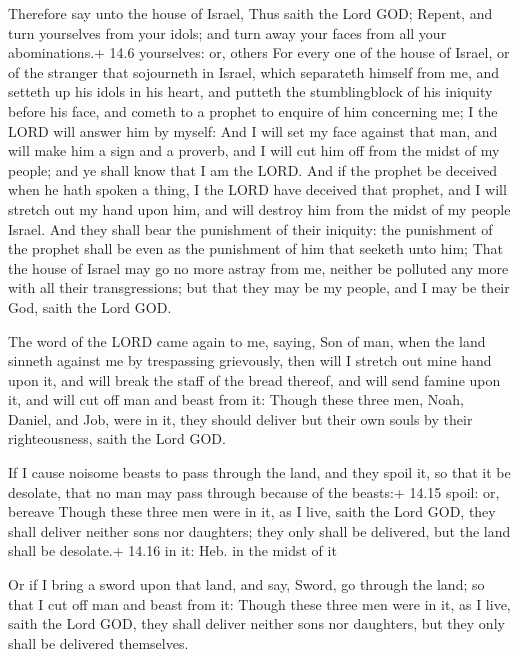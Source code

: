  Therefore say unto the house of Israel, Thus saith the
Lord GOD; Repent, and turn yourselves from your idols; and turn away
your faces from all your abominations.+ 14.6 yourselves: or, others
 For every one of the house of Israel, or of the stranger
that sojourneth in Israel, which separateth himself from me, and setteth
up his idols in his heart, and putteth the stumblingblock of his
iniquity before his face, and cometh to a prophet to enquire of him
concerning me; I the LORD will answer him by myself:  And I
will set my face against that man, and will make him a sign and a
proverb, and I will cut him off from the midst of my people; and ye
shall know that I am the LORD.  And if the prophet be
deceived when he hath spoken a thing, I the LORD have deceived that
prophet, and I will stretch out my hand upon him, and will destroy him
from the midst of my people Israel.  And they shall bear
the punishment of their iniquity: the punishment of the prophet shall be
even as the punishment of him that seeketh unto him;  That
the house of Israel may go no more astray from me, neither be polluted
any more with all their transgressions; but that they may be my people,
and I may be their God, saith the Lord GOD.

 The word of the LORD came again to me, saying,
 Son of man, when the land sinneth against me by
trespassing grievously, then will I stretch out mine hand upon it, and
will break the staff of the bread thereof, and will send famine upon it,
and will cut off man and beast from it:  Though these three
men, Noah, Daniel, and Job, were in it, they should deliver but their
own souls by their righteousness, saith the Lord GOD.

 If I cause noisome beasts to pass through the land, and
they spoil it, so that it be desolate, that no man may pass through
because of the beasts:+ 14.15 spoil: or, bereave  Though
these three men were in it, as I live, saith the Lord GOD, they shall
deliver neither sons nor daughters; they only shall be delivered, but
the land shall be desolate.+ 14.16 in it: Heb. in the midst of it

 Or if I bring a sword upon that land, and say, Sword, go
through the land; so that I cut off man and beast from it: 
Though these three men were in it, as I live, saith the Lord GOD, they
shall deliver neither sons nor daughters, but they only shall be
delivered themselves.

